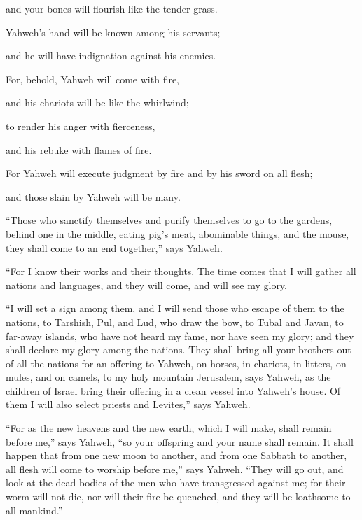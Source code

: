 {\par }{\QB and your bones will flourish like the tender grass.
\par }{\Q Yahweh’s hand will be known among his servants;
\par }{\QB and he will have indignation against his enemies.
\par }{\BB \par }{\Q {}For, behold, Yahweh will come with fire,
\par }{\QB and his chariots will be like the whirlwind;
\par }{\Q to render his anger with fierceness,
\par }{\QB and his rebuke with flames of fire.
\par }{\Q {}For Yahweh will execute judgment by fire and by his sword on all flesh;
\par }{\QB and those slain by Yahweh will be many.
\par }{\PP {}“Those who sanctify themselves and purify themselves to go to the gardens, behind one in the middle, eating pig’s meat, abominable things, and the mouse, they shall come to an end together,” says Yahweh.
\par }{\PP {}“For I know their works and their thoughts. The time comes that I will gather all nations and languages, and they will come, and will see my glory.
\par }{\PP {}“I will set a sign among them, and I will send those who escape of them to the nations, to Tarshish, Pul, and Lud, who draw the bow, to Tubal and Javan, to far-away islands, who have not heard my fame, nor have seen my glory; and they shall declare my glory among the nations.
They shall bring all your brothers out of all the nations for an offering to Yahweh, on horses, in chariots, in litters, on mules, and on camels, to my holy mountain Jerusalem, says Yahweh, as the children of Israel bring their offering in a clean vessel into Yahweh’s house.
Of them I will also select priests and Levites,” says Yahweh.
\par }{\PP {}“For as the new heavens and the new earth, which I will make, shall remain before me,” says Yahweh, “so your offspring and your name shall remain.
It shall happen that from one new moon to another, and from one Sabbath to another, all flesh will come to worship before me,” says Yahweh.
“They will go out, and look at the dead bodies of the men who have transgressed against me; for their worm will not die, nor will their fire be quenched, and they will be loathsome to all mankind.”
\par }